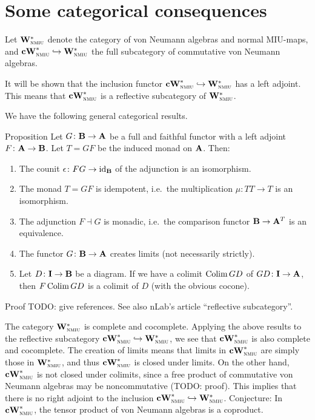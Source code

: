 \documentclass[main]{subfiles}
\begin{document}
\section{Some categorical consequences}

\begin{parsec}%
\begin{point}%
Let $\mathbf{W}^*_{\text{\textsc{nmiu}}}$ denote the category of von Neumann algebras
and normal MIU-maps, and $\mathbf{cW}^*_{\text{\textsc{nmiu}}}\hookrightarrow\mathbf{W}^*_{\text{\textsc{nmiu}}}$
the full subcategory of commutative von Neumann algebras.

It will be shown that the inclusion functor
$\mathbf{cW}^*_{\text{\textsc{nmiu}}}\hookrightarrow\mathbf{W}^*_{\text{\textsc{nmiu}}}$ has a left adjoint.
This means that $\mathbf{cW}^*_{\text{\textsc{nmiu}}}$ is a reflective subcategory of $\mathbf{W}^*_{\text{\textsc{nmiu}}}$.

We have the following general categorical results.
\end{point}
\begin{point}{Proposition}%
Let $G\colon\mathbf{B}\to\mathbf{A}$ be a full and faithful functor
with a left adjoint $F\colon\mathbf{A}\to\mathbf{B}$.
Let $T=GF$ be the induced monad on $\mathbf{A}$.
Then:
\begin{enumerate}
\item
The counit $\epsilon\colon FG\to\operatorname{id}_{\mathbf{B}}$
of the adjunction is an isomorphism.
\item
The monad $T=GF$ is idempotent,
i.e.\ the multiplication $\mu\colon TT\to T$
is an isomorphism.
\item
The adjunction $F\dashv G$ is monadic,
i.e.\ the comparison functor $\mathbf{B}\to\mathbf{A}^{T}$
is an equivalence.
\item
The functor $G\colon\mathbf{B}\to\mathbf{A}$ creates limits
(not necessarily strictly).
\item
Let $D\colon\mathbf{I}\to\mathbf{B}$ be a diagram.
If we have a colimit $\operatorname{Colim} GD$ of $GD\colon\mathbf{I}\to\mathbf{A}$,
then $F\operatorname{Colim} GD$ is a colimit of $D$
(with the obvious cocone).
\end{enumerate}
\begin{point}{Proof}%
TODO: give references.
See also nLab's article ``reflective subcategory''.
\end{point}
\end{point}
\begin{point}%
The category $\mathbf{W}^*_{\text{\textsc{nmiu}}}$ is complete and cocomplete.
Applying the above results to
the reflective subcategory $\mathbf{cW}^*_{\text{\textsc{nmiu}}}\hookrightarrow\mathbf{W}^*_{\text{\textsc{nmiu}}}$,
we see that $\mathbf{cW}^*_{\text{\textsc{nmiu}}}$ is also complete and cocomplete.
The creation of limits means
that limits in $\mathbf{cW}^*_{\text{\textsc{nmiu}}}$ are simply those in $\mathbf{W}^*_{\text{\textsc{nmiu}}}$,
and thus $\mathbf{cW}^*_{\text{\textsc{nmiu}}}$ is closed under limits.
On the other hand, $\mathbf{cW}^*_{\text{\textsc{nmiu}}}$ is not closed under colimits,
since a free product of commutative von Neumann algebras
may be noncommutative (TODO: proof). This implies that
there is no right adjoint to
the inclusion $\mathbf{cW}^*_{\text{\textsc{nmiu}}}\hookrightarrow\mathbf{W}^*_{\text{\textsc{nmiu}}}$.
Conjecture: In $\mathbf{cW}^*_{\text{\textsc{nmiu}}}$,
the tensor product of von Neumann algebras
is a coproduct.
\end{point}
\end{parsec}
\end{document}
